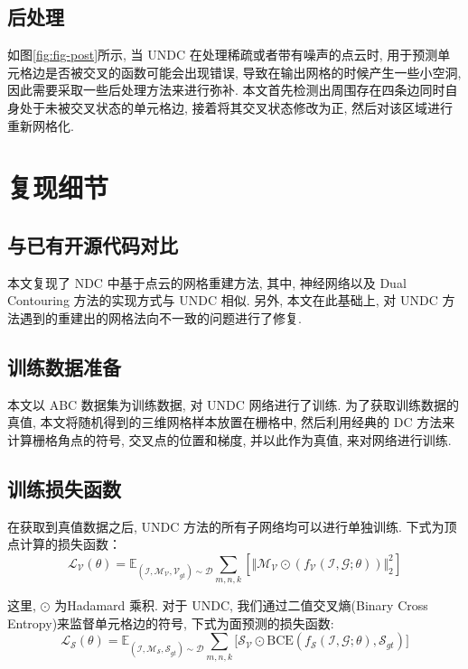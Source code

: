 \subsection{后处理}
如图\ref{fig:fig-post}所示, 当 UNDC 在处理稀疏或者带有噪声的点云时, 用于预测单元格边是否被交叉的函数可能会出现错误, 导致在输出网格的时候产生一些小空洞, 因此需要采取一些后处理方法来进行弥补. 本文首先检测出周围存在四条边同时自身处于未被交叉状态的单元格边, 接着将其交叉状态修改为正, 然后对该区域进行重新网格化. 

\section{复现细节}

\subsection{与已有开源代码对比}
本文复现了 NDC 中基于点云的网格重建方法, 其中, 神经网络以及 Dual Contouring 方法的实现方式与 UNDC 相似. 另外, 本文在此基础上, 对 UNDC 方法遇到的重建出的网格法向不一致的问题进行了修复. 

\subsection{训练数据准备}
本文以 ABC 数据集为训练数据, 对 UNDC 网络进行了训练. 为了获取训练数据的真值, 本文将随机得到的三维网格样本放置在栅格中, 然后利用经典的 DC 方法来计算栅格角点的符号, 交叉点的位置和梯度, 并以此作为真值, 来对网络进行训练. 

\subsection{训练损失函数}
在获取到真值数据之后, UNDC 方法的所有子网络均可以进行单独训练. 下式为顶点计算的损失函数：
\begin{equation}
    \mathcal{L_V}(\theta)=\mathbb{E}_{(\mathcal{I, M_V, V}_{gt})\sim \mathcal{D}}\sum _{m,n,k} [ \Vert \mathcal{M_V} \odot (f_{\mathcal{V}}(\mathcal{I,G};\theta)) \Vert ^2_2 ]
\end{equation}

这里, $\odot$ 为Hadamard 乘积. 对于 UNDC, 我们通过二值交叉熵(Binary Cross Entropy)来监督单元格边的符号, 下式为面预测的损失函数:
\begin{equation}
    \mathcal{L_S}(\theta)=\mathbb{E}_{(\mathcal{I, M_S, S}_{gt})\sim \mathcal{D}}\sum_{m,n,k} \lbrack \mathcal{S_V} \odot \mathrm{BCE}(f_\mathcal{S}(\mathcal{I,G};\theta), \mathcal{S}_{gt}) \rbrack
\end{equation}

